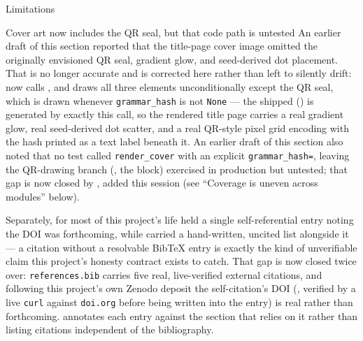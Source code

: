 \documentclass[
  ignorenonframetext,
]{beamer}
\begin{document}
\begin{frame}{Limitations}
\begin{block}{Cover art now includes the QR seal, but that code path is
untested}
\protect{}\label{cover-art-now-includes-the-qr-seal-but-that-code-path-is-untested}
An earlier draft of this section reported that the title-page cover
image omitted the originally envisioned QR seal, gradient glow, and
seed-derived dot placement. That is no longer accurate and is corrected
here rather than left to silently drift:
 now calls
, and
 draws all three elements unconditionally
except the QR seal, which is drawn whenever \texttt{grammar\_hash} is
not \texttt{None} --- the shipped 
() is generated by exactly this
call, so the rendered title page carries a real gradient glow, real
seed-derived dot scatter, and a real QR-style pixel grid encoding
 with the hash printed as a text label beneath
it. An earlier draft of this section also noted that no test called
\texttt{render\_cover} with an explicit \texttt{grammar\_hash=}, leaving
the QR-drawing branch (, the
 block) exercised in
production but untested; that gap is now closed by
,
added this session (see ``Coverage is uneven across modules'' below).

Separately, for most of this project's life
 held a single self-referential
 entry noting the DOI was forthcoming,
while  carried a hand-written, uncited list
alongside it --- a citation without a resolvable BibTeX entry is exactly
the kind of unverifiable claim this project's honesty contract exists to
catch. That gap is now closed twice over: \texttt{references.bib}
carries five real, live-verified external citations, and following this
project's own Zenodo deposit the self-citation's DOI
(, verified by a live \texttt{curl}
against \texttt{doi.org} before being written into the entry) is real
rather than forthcoming.  annotates each entry
against the section that relies on it rather than listing citations
independent of the bibliography.
\end{block}
\end{frame}
\end{document}
